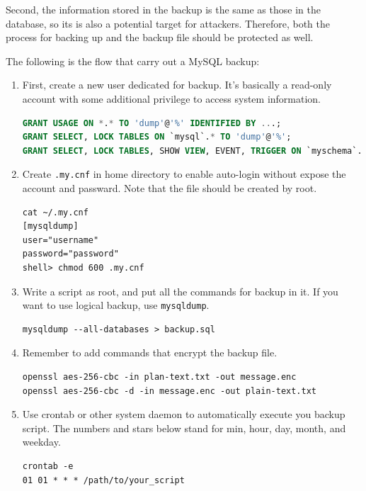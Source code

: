 \documentclass[conference]{IEEEtran}
\begin{document}
Second, the information stored in the backup is the same as those
in the database, so its
is also a potential target for attackers.
Therefore,
both the process for backing up and the backup file should be protected as well.

The following is the flow that carry out a MySQL backup:
\begin{enumerate}[label=\textbf{\arabic*.}]
    \item
First, create a new user dedicated for backup. It's basically a read-only
account with some additional privilege to access system information.
\begin{lstlisting}[language=sql]
GRANT USAGE ON *.* TO 'dump'@'%' IDENTIFIED BY ...;
GRANT SELECT, LOCK TABLES ON `mysql`.* TO 'dump'@'%';
GRANT SELECT, LOCK TABLES, SHOW VIEW, EVENT, TRIGGER ON `myschema`.* TO 'dump'@'\%';
\end{lstlisting}

\item
Create \lstinline{.my.cnf} in home directory to enable auto-login
without expose the account and passward. Note that the file should be
created by root.

\begin{lstlisting}
cat ~/.my.cnf
[mysqldump]
user="username"
password="password"
shell> chmod 600 .my.cnf
\end{lstlisting}

\item
Write a script as root, and put all the commands for backup in it.
If you want to use logical backup, use \lstinline{mysqldump}.
\begin{lstlisting}
mysqldump --all-databases > backup.sql
\end{lstlisting}

\item
Remember to add commands that encrypt the backup file.
%
\begin{lstlisting}
openssl aes-256-cbc -in plan-text.txt -out message.enc
openssl aes-256-cbc -d -in message.enc -out plain-text.txt
\end{lstlisting}

\item
Use crontab or other system daemon to automatically execute you backup script.
The numbers and stars below stand for min, hour, day, month, and weekday.
\begin{lstlisting}
crontab -e
01 01 * * * /path/to/your_script
\end{lstlisting}

\end{enumerate}
\end{document}

